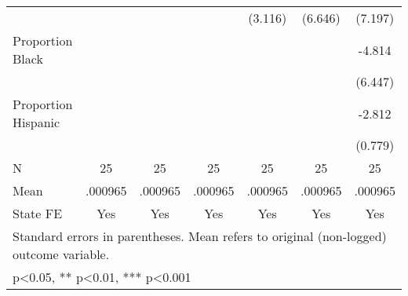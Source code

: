 {\begin{tabular}{l*{6}{c}}
                    &                     &                     &                     &     (3.116)         &     (6.646)         &     (7.197)         \\
\addlinespace
Proportion Black    &                     &                     &                     &                     &                     &      -4.814         \\
                    &                     &                     &                     &                     &                     &     (6.447)         \\
\addlinespace
Proportion Hispanic &                     &                     &                     &                     &                     &      -2.812\sym{**} \\
                    &                     &                     &                     &                     &                     &     (0.779)         \\
\midrule
N                   &          25         &          25         &          25         &          25         &          25         &          25         \\
Mean                &     .000965         &     .000965         &     .000965         &     .000965         &     .000965         &     .000965         \\
State FE            &         Yes         &         Yes         &         Yes         &         Yes         &         Yes         &         Yes         \\
\bottomrule
\multicolumn{7}{l}{\footnotesize Standard errors in parentheses. Mean refers to original (non-logged) outcome variable.}\\
\multicolumn{7}{l}{\footnotesize * p<0.05, ** p<0.01, *** p<0.001}\\
\end{tabular}
}
